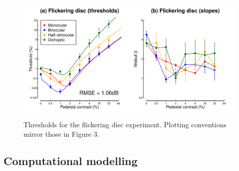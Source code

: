 \documentclass[
]{article}
\begin{document}
\begin{figure}

{\centering \includegraphics[width=0.8\linewidth]{Figures/discdata} 

}

\caption{Thresholds for the flickering disc experiment. Plotting conventions mirror those in Figure 3.}\label{fig:discdata}
\end{figure}

\hypertarget{computational-modelling}{%
\subsection{Computational modelling}\label{computational-modelling}}
\end{document}
